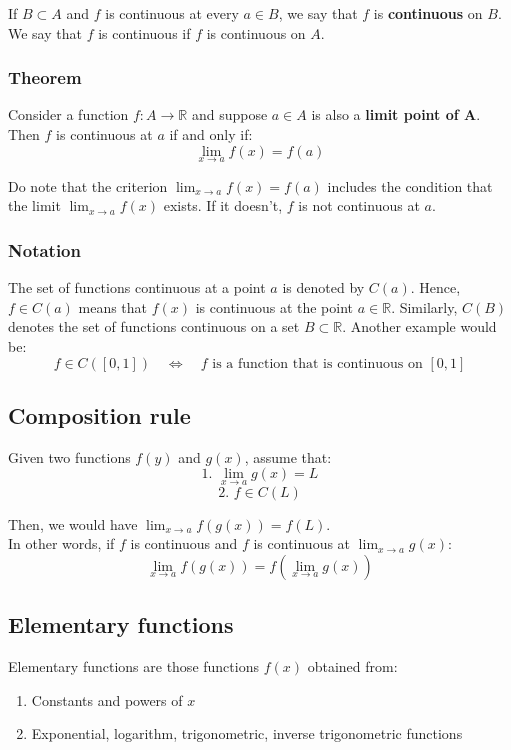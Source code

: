 \documentclass[11pt]{article}
\begin{document}
If \(B \subset A\) and \(f\) is continuous at every \(a \in B\), we say that \(f\) is \textbf{continuous} on \(B\).
\\[0pt]

We say that \(f\) is continuous if \(f\) is continuous on \(A\).

\subsubsection{Theorem}
\label{sec:org698d8b3}
Consider a function \(f : A \rightarrow \mathbb{R}\) and suppose \(a \in A\) is also a \textbf{limit point of A}. Then \(f\) is continuous at \(a\) if and only if:
\[\lim_{x \rightarrow a} f(x) = f(a)\]

Do note that the criterion \(\lim_{x \rightarrow a} f(x) = f(a)\) includes the condition that the limit \(\lim_{x \rightarrow a} f(x)\) exists. If it doesn't, \(f\) is not continuous at \(a\).

\subsubsection{Notation}
\label{sec:org0de77ac}
The set of functions continuous at a point \(a\) is denoted by \(C(a)\). Hence, \(f \in C(a)\) means that \(f(x)\) is continuous at the point \(a \in \mathbb{R}\). Similarly, \(C(B)\) denotes the set of functions continuous on a set \(B \subset \mathbb{R}\). Another example would be:
\[f \in C([0, 1]) \quad \Leftrightarrow \quad f \text{ is a function that is continuous on } [0, 1]\]

\subsection{Composition rule}
\label{sec:org29e5e92}
Given two functions \(f(y)\) and \(g(x)\), assume that:
\[\text{1. } \lim_{x \rightarrow a} g(x) = L\]
\[\text{2. } f \in C(L)\]

Then, we would have \(\lim_{x \rightarrow a} f(g(x)) = f(L)\).
\\[0pt]

In other words, if \(f\) is continuous and \(f\) is continuous at \(\lim_{x \rightarrow a} g(x)\):
\[\lim_{x \rightarrow a} f(g(x)) = f(\lim_{x \rightarrow a} g(x))\]

\subsection{Elementary functions}
\label{sec:org44bba80}
Elementary functions are those functions \(f(x)\) obtained from:
\begin{enumerate}
\item Constants and powers of \(x\)
\item Exponential, logarithm, trigonometric, inverse trigonometric functions
\end{enumerate}
\end{document}
